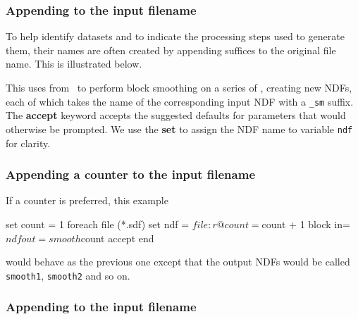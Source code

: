 \documentclass[twoside,11pt,nolof]{starlink}
\providecommand{\KAPPAref}{\xref{{\footnotesize KAPPA}}{sun95}{}}
\providecommand{\NDFref}[1]{\xref{#1}{sun33}{}}
\begin{document}
\subsubsection{Appending to the input
filename\label{sc4_se_append_filename}}

To help identify datasets and to indicate the processing steps used to
generate them, their names are often created by appending suffices to
the original file name.  This is illustrated below.

\begin{small}
\end{small}
This uses  from \KAPPAref\normalsize\ to perform
block smoothing on a series of \NDFref{\textsf{NDF}s}, creating new NDFs,
each of which takes the name of the corresponding input NDF with a
\texttt{\_sm} suffix.  The \textbf{accept} keyword accepts the suggested
defaults for parameters that would otherwise be prompted.  We use the
\textbf{set} to assign the NDF name to variable \texttt{ndf} for clarity.

\subsubsection{Appending a counter to the input
filename\label{sc4_se_append_counter}}

If a counter is preferred, this example

\begin{small}
\begin{terminalv}
     set count = 1
     foreach file (*.sdf)
        set ndf = $file:r
        @ count = $count + 1
        block in=$ndf out=smooth$count accept
     end
\end{terminalv}
\end{small}
would behave as the previous one except that the output NDFs would be
called \texttt{smooth1}, \texttt{smooth2} and so on.

\subsubsection{Appending to the input
filename\label{sc4_se_filename_substitution}}
\end{document}
